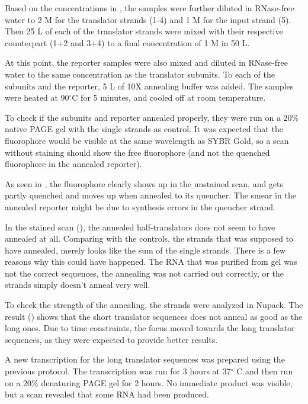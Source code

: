 Based on the concentrations in , the samples were further diluted in RNase-free water to 2 \si{\micro}M for the translator strands (1-4) and 1 \si{\micro}M for the input strand (5). Then 25 \si{\micro}L of each of the translator strands were mixed with their respective counterpart (1+2 and 3+4) to a final concentration of 1 \si{\micro}M in 50 \si{\micro}L.

At this point, the reporter samples were also mixed and diluted in RNase-free water to the same concentration as the translator subunits. To each of the subunits and the reporter, 5 \si{\micro}L of 10X annealing buffer was added. The samples were heated at 90$^\circ$C for 5 minutes, and cooled off at room temperature.

To check if the subunits and reporter annealed properly, they were run on a 20\% native PAGE gel with the single strands as control. It was expected that the fluorophore would be visible at the same wavelength as SYBR Gold, so a scan without staining should show the free fluorophore (and not the quenched fluorophore in the annealed reporter).

As seen in , the fluorophore clearly shows up in the unstained scan, and gets partly quenched and moves up when annealed to its quencher. The smear in the annealed reporter might be due to synthesis errors in the quencher strand.

In the stained scan (), the annealed half-translators does not seem to have annealed at all. Comparing with the controls, the strands that was supposed to have annealed, merely looks like the sum of the single strands. There is a few reasons why this could have happened. The RNA that was purified from gel was not the correct sequences, the annealing was not carried out correctly, or the strands simply doesn't anneal very well.

To check the strength of the annealing, the strands were analyzed in Nupack. The result () shows that the short translator sequences does not anneal as good as the long ones. Due to time constraints, the focus moved towards the long translator sequences, as they were expected to provide better results.

A new transcription for the long translator sequences was prepared using the previous protocol. The transcription was run for 3 hours at 37$^\circ$ C and then run on a 20\% denaturing PAGE gel for 2 hours. No immediate product was visible, but a scan revealed that some RNA had been produced.

